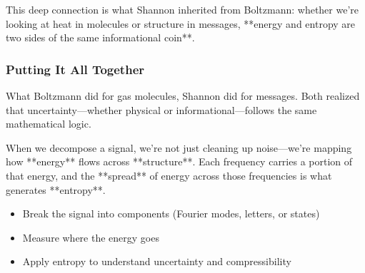 This deep connection is what Shannon inherited from Boltzmann: whether we're looking at heat in molecules or structure in messages, **energy and entropy are two sides of the same informational coin**.


\subsubsection{Putting It All Together}

What Boltzmann did for gas molecules, Shannon did for messages. Both realized that uncertainty—whether physical or informational—follows the same mathematical logic. 

When we decompose a signal, we’re not just cleaning up noise—we’re mapping how **energy** flows across **structure**. Each frequency carries a portion of that energy, and the **spread** of energy across those frequencies is what generates **entropy**.

\begin{itemize}
  \item Break the signal into components (Fourier modes, letters, or states)
  \item Measure where the energy goes
  \item Apply entropy to understand uncertainty and compressibility
\end{itemize}


